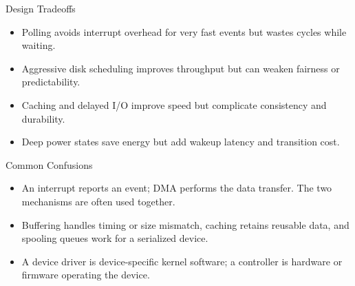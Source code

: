 \documentclass[10pt,letterpaper]{article}
\begin{document}
\begin{studybox}{Design Tradeoffs}
\begin{itemize}
  \item Polling avoids interrupt overhead for very fast events but wastes cycles while waiting.
  \item Aggressive disk scheduling improves throughput but can weaken fairness or predictability.
  \item Caching and delayed I/O improve speed but complicate consistency and durability.
  \item Deep power states save energy but add wakeup latency and transition cost.
\end{itemize}
\end{studybox}

\begin{studybox}{Common Confusions}
\begin{itemize}
  \item An interrupt reports an event; DMA performs the data transfer. The two mechanisms are often used together.
  \item Buffering handles timing or size mismatch, caching retains reusable data, and spooling queues work for a serialized device.
  \item A device driver is device-specific kernel software; a controller is hardware or firmware operating the device.
\end{itemize}
\end{studybox}
\end{document}
